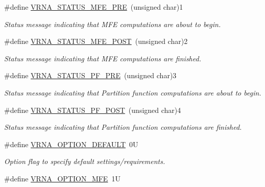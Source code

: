 \begin{DoxyCompactItemize}
\item 
\#define \hyperlink{group__fold__compound_ga1a5053dc8acbb0111e852988726f07d6}{V\+R\+N\+A\+\_\+\+S\+T\+A\+T\+U\+S\+\_\+\+M\+F\+E\+\_\+\+P\+RE}~(unsigned char)1
\begin{DoxyCompactList}\small\item\em Status message indicating that M\+FE computations are about to begin. \end{DoxyCompactList}\item 
\#define \hyperlink{group__fold__compound_ga47c900ca76e56e59e2e83a06e0bde641}{V\+R\+N\+A\+\_\+\+S\+T\+A\+T\+U\+S\+\_\+\+M\+F\+E\+\_\+\+P\+O\+ST}~(unsigned char)2
\begin{DoxyCompactList}\small\item\em Status message indicating that M\+FE computations are finished. \end{DoxyCompactList}\item 
\#define \hyperlink{group__fold__compound_ga91795d35ebdb6f32be50459f24b3d114}{V\+R\+N\+A\+\_\+\+S\+T\+A\+T\+U\+S\+\_\+\+P\+F\+\_\+\+P\+RE}~(unsigned char)3
\begin{DoxyCompactList}\small\item\em Status message indicating that Partition function computations are about to begin. \end{DoxyCompactList}\item 
\#define \hyperlink{group__fold__compound_ga1c6fa243533fd026e50f7d595eaaa565}{V\+R\+N\+A\+\_\+\+S\+T\+A\+T\+U\+S\+\_\+\+P\+F\+\_\+\+P\+O\+ST}~(unsigned char)4
\begin{DoxyCompactList}\small\item\em Status message indicating that Partition function computations are finished. \end{DoxyCompactList}\item 
\mbox{\label{group__fold__compound_gacea5b7ee6181c485f36e2afa0e9089e4}} 
\#define \hyperlink{group__fold__compound_gacea5b7ee6181c485f36e2afa0e9089e4}{V\+R\+N\+A\+\_\+\+O\+P\+T\+I\+O\+N\+\_\+\+D\+E\+F\+A\+U\+LT}~0U
\begin{DoxyCompactList}\small\item\em Option flag to specify default settings/requirements. \end{DoxyCompactList}\item 
\#define \hyperlink{group__fold__compound_gae63be9127fe7dcc1f9bb14f5bb1064ee}{V\+R\+N\+A\+\_\+\+O\+P\+T\+I\+O\+N\+\_\+\+M\+FE}~1U

\end{DoxyCompactItemize}
